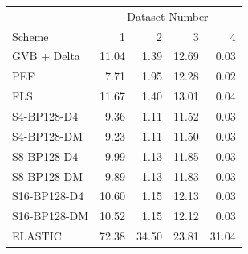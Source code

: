 \begin{tabular}{lrrrr}
\toprule
 & \multicolumn{4}{c}{Dataset Number} \\
Scheme & 1 & 2 & 3 & 4 \\
\midrule
GVB + Delta & 11.04 & 1.39 & 12.69 & 0.03 \\
PEF & 7.71 & 1.95 & 12.28 & 0.02 \\
FLS & 11.67 & 1.40 & 13.01 & 0.04 \\
S4-BP128-D4 & 9.36 & 1.11 & 11.52 & 0.03 \\
S4-BP128-DM & 9.23 & 1.11 & 11.50 & 0.03 \\
S8-BP128-D4 & 9.99 & 1.13 & 11.85 & 0.03 \\
S8-BP128-DM & 9.89 & 1.13 & 11.83 & 0.03 \\
S16-BP128-D4 & 10.60 & 1.15 & 12.13 & 0.03 \\
S16-BP128-DM & 10.52 & 1.15 & 12.12 & 0.03 \\
ELASTIC & 72.38 & 34.50 & 23.81 & 31.04 \\
\bottomrule
\end{tabular}
